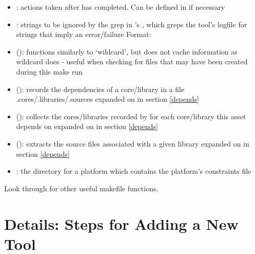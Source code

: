 \begin{itemize}
\item {}: actions taken after  has completed. Can be defined in  if necessary
\item {}: strings to be ignored by the grep in 's , which greps the tool's logfile for strings that imply an error/failure
	\subitem Format: 
\item {} (): functions similarly to `wildcard', but does not cache information as wildcard does
	\subitem - useful when checking for files that may have been created during this make run
\item {} (): records the dependencies of a core/library in a file .cores/.libraries/.sources
	\subitem * expanded on in section \ref{depends}
\item {} (): collects the cores/libraries recorded by  for each core/library this asset depends on
	\subitem * expanded on in section \ref{depends}
\item {} (): extracts the source files associated with a given library
	\subitem * expanded on in section \ref{depends}
\item {}: the directory for a platform which contains the platform's constraints file
\end{itemize}

Look through  for other useful makefile functions.

\section{Details: Steps for Adding a New Tool}
